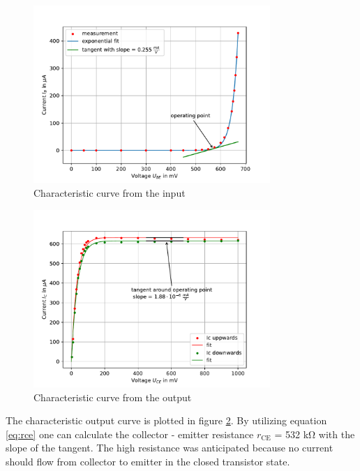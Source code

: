 \documentclass[11pt, a4paper]{article}
\begin{document}
\begin{figure}[h]
    \centering
    \includegraphics[width=0.8\textwidth]{plots/Eingangskennlinie.pdf}
    \caption{Characteristic curve from the input}
    \label{fig:Eincur}
\end{figure}

\begin{figure}[h]
    \centering
    \includegraphics[width=0.8\textwidth]{plots/Ausgangskennlinie.pdf}
    \caption{Characteristic curve from the output}
    \label{fig:Outcur}
\end{figure}
The characteristic output curve is plotted in figure \ref{fig:Outcur}. By utilizing equation \ref{eq:rce} one can calculate the collector - emitter resistance $r_{\text{CE}}$ = 532 \si{\kilo\ohm} with the slope of the tangent.
The high resistance was anticipated because no current should flow from collector to emitter in the closed transistor state.
\end{document}
